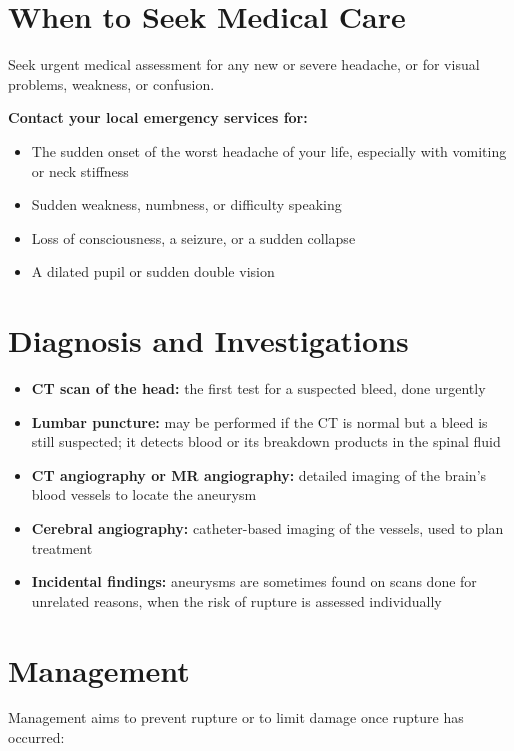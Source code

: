 \section*{When to Seek Medical Care}
Seek urgent medical assessment for any new or severe headache, or for visual problems, weakness, or confusion.

\textbf{Contact your local emergency services for:}
\begin{itemize}
    \item The sudden onset of the worst headache of your life, especially with vomiting or neck stiffness
    \item Sudden weakness, numbness, or difficulty speaking
    \item Loss of consciousness, a seizure, or a sudden collapse
    \item A dilated pupil or sudden double vision
\end{itemize}

\section*{Diagnosis and Investigations}
\begin{itemize}
    \item \textbf{CT scan of the head:} the first test for a suspected bleed, done urgently
    \item \textbf{Lumbar puncture:} may be performed if the CT is normal but a bleed is still suspected; it detects blood or its breakdown products in the spinal fluid
    \item \textbf{CT angiography or MR angiography:} detailed imaging of the brain's blood vessels to locate the aneurysm
    \item \textbf{Cerebral angiography:} catheter-based imaging of the vessels, used to plan treatment
    \item \textbf{Incidental findings:} aneurysms are sometimes found on scans done for unrelated reasons, when the risk of rupture is assessed individually
\end{itemize}

\section*{Management}
Management aims to prevent rupture or to limit damage once rupture has occurred:

